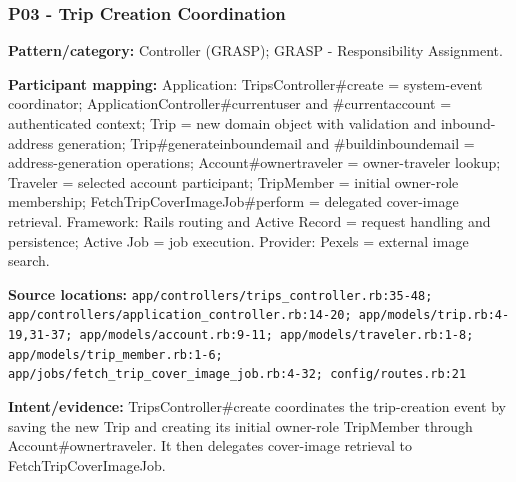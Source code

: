 \documentclass[11pt,a4paper]{article}
\renewcommand{\_}{\textunderscore\allowbreak}
\begin{document}
\subsubsection*{P03 - Trip Creation Coordination}
\textbf{Pattern/category:} Controller (GRASP); GRASP - Responsibility Assignment.\par
\textbf{Participant mapping:} Application: TripsController\#create = system-event coordinator; ApplicationController\#current\_user and \#current\_account = authenticated context; Trip = new domain object with validation and inbound-address generation; Trip\#generate\_inbound\_email and \#build\_inbound\_email = address-generation operations; Account\#owner\_traveler = owner-traveler lookup; Traveler = selected account participant; TripMember = initial owner-role membership; FetchTripCoverImageJob\#perform = delegated cover-image retrieval. Framework: Rails routing and Active Record = request handling and persistence; Active Job = job execution. Provider: Pexels = external image search.\par
\textbf{Source locations:} \nolinkurl{app/controllers/trips_controller.rb:35-48; app/controllers/application_controller.rb:14-20; app/models/trip.rb:4-19,31-37; app/models/account.rb:9-11; app/models/traveler.rb:1-8; app/models/trip_member.rb:1-6; app/jobs/fetch_trip_cover_image_job.rb:4-32; config/routes.rb:21}\par
\textbf{Intent/evidence:} TripsController\#create coordinates the trip-creation event by saving the new Trip and creating its initial owner-role TripMember through Account\#owner\_traveler. It then delegates cover-image retrieval to FetchTripCoverImageJob.\par
\end{document}
